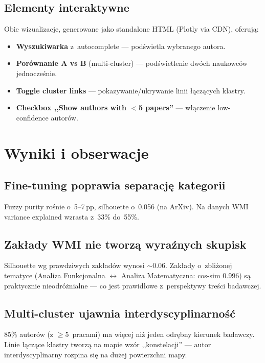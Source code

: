 \documentclass[a4paper,11pt]{article}
\begin{document}
\subsection{Elementy interaktywne}

Obie wizualizacje, generowane jako standalone HTML (Plotly via CDN), oferują:
\begin{itemize}[nosep]
  \item \textbf{Wyszukiwarka} z~autocomplete --- podświetla wybranego autora.
  \item \textbf{Porównanie A vs B} (multi-cluster) --- podświetlenie dwóch naukowców jednocześnie.
  \item \textbf{Toggle cluster links} --- pokazywanie/ukrywanie linii łączących klastry.
  \item \textbf{Checkbox ,,Show authors with $<$5 papers''} --- włączenie low-confidence autorów.
\end{itemize}


\section{Wyniki i obserwacje}

\subsection{Fine-tuning poprawia separację kategorii}
Fuzzy purity rośnie o~5--7\,pp, silhouette o~0.056 (na ArXiv).
Na danych WMI variance explained wzrasta z~33\% do~55\%.

\subsection{Zakłady WMI nie tworzą wyraźnych skupisk}
Silhouette wg prawdziwych zakładów wynosi $\sim$0.06.
Zakłady o~zbliżonej tematyce (Analiza Funkcjonalna $\leftrightarrow$ Analiza Matematyczna: cos-sim 0.996) są praktycznie nieodróżnialne --- co jest prawidłowe z~perspektywy treści badawczej.

\subsection{Multi-cluster ujawnia interdyscyplinarność}
85\% autorów (z $\geq$5~pracami) ma więcej niż jeden odrębny kierunek badawczy.
Linie łączące klastry tworzą na mapie wzór ,,konstelacji'' --- autor interdyscyplinarny rozpina się na dużej powierzchni mapy.
\end{document}
